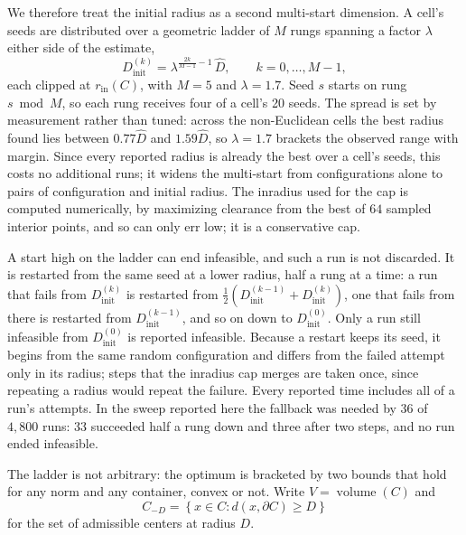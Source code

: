\documentclass[preprint,12pt]{elsarticle}
\theoremstyle{remark}
\newcommand{\set}[1]{\left\{ #1 \right\}}
\newcommand{\paren}[1]{\left( #1 \right)}
\begin{document}
We therefore treat the initial radius as a second multi-start dimension. A
cell's seeds are distributed over a geometric ladder of $M$ rungs spanning a
factor $\lambda$ either side of the estimate,
\begin{equation}
  D_{\text{init}}^{(k)} = \lambda^{\frac{2k}{M - 1} - 1} \, \hat D,
  \qquad k = 0, \dots, M - 1,
  \label{eq:dinit_ladder}
\end{equation}
each clipped at $r_{\text{in}}(C)$, with $M = 5$ and $\lambda = 1.7$. Seed $s$
starts on rung $s \bmod M$, so each rung receives four of a cell's 20 seeds. The
spread is set by measurement rather than tuned: across the non-Euclidean cells
the best radius found lies between $0.77 \hat D$ and $1.59 \hat D$, so $\lambda
= 1.7$ brackets the observed range with margin. Since every reported radius is
already the best over a cell's seeds, this costs no additional runs; it widens
the multi-start from configurations alone to pairs of configuration and initial
radius. The inradius used for the cap is computed numerically, by maximizing
clearance from the best of $64$ sampled interior points, and so can only err
low; it is a conservative cap.

A start high on the ladder can end infeasible, and such a run is not discarded.
It is restarted from the same seed at a lower radius, half a rung at a time: a
run that fails from $D_{\text{init}}^{(k)}$ is restarted from $\tfrac12
\paren{D_{\text{init}}^{(k-1)} + D_{\text{init}}^{(k)}}$, one that fails from
there is restarted from $D_{\text{init}}^{(k-1)}$, and so on down to
$D_{\text{init}}^{(0)}$. Only a run still infeasible from
$D_{\text{init}}^{(0)}$ is reported infeasible. Because a restart keeps its
seed, it begins from the same random configuration and differs from the failed
attempt only in its radius; steps that the inradius cap merges are taken once,
since repeating a radius would repeat the failure. Every reported time includes
all of a run's attempts. In the sweep reported here the fallback was needed by
$36$ of $4{,}800$ runs: 33 succeeded half a rung down and three after two steps,
and no run ended infeasible.

The ladder is not arbitrary: the optimum is bracketed by two bounds that hold
for any norm and any container, convex or not. Write $V =
\operatorname{volume}(C)$ and
\begin{equation}
  C_{-D} = \set{x \in C : d(x, \partial C) \ge D}
  \label{eq:inner_body}
\end{equation}
for the set of admissible centers at radius $D$.
\end{document}
